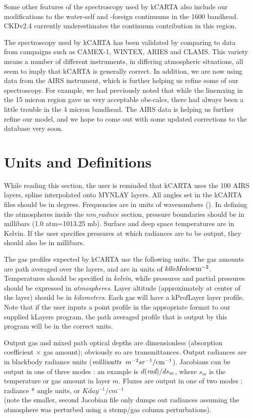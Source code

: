 \documentclass[12pt]{article}
\newcommand{\kc}{\textsf{kCARTA}\xspace}
\newcommand{\cm}{\hbox{cm}}
\begin{document}
Some other features of the spectroscopy used by \kc also include our 
modifications to the water-self and -foreign continuums in the 1600 \wn 
bandhead. CKDv2.4 currently underestimates the continuum contribution in this 
region.

The spectroscopy used by \kc has been validated by comparing to data from 
campaigns such as CAMEX-1, WINTEX, ARIES and CLAMS. This variety means a 
number of different instruments, in differing atmospheric situations, all seem
to imply that \kc is generally correct. In addition, we are now using data from
the AIRS instrument, which is further helping us refine some of our 
spectroscopy. For example, we had previously noted that while the linemxing 
in the 15 micron region gave us very acceptable obs-calcs, there had always 
been a little trouble in the 4 micron bandhead. The AIRS data is helping us 
further refine our model, and we hope to come out with some updated corrections
to the database very soon.

\section{Units and Definitions}

While reading this section, the user is reminded that \kc uses the 100
AIRS layers, spline interpolated onto MYNLAY layers. All angles set in the 
\kc files should be in degrees.
Frequencies are in units of wavenumbers (\wn).  In defining the
atmospheres inside the $nm\_radnce$ section, pressure boundaries should be
in millibars (1.0 atm=1013.25 mb).  Surface and deep space temperatures
are in Kelvin.  If the user specifies pressures at which radiances are
to be output, they should also be in millibars.

The gas profiles expected by \kc use the following units.  The gas
amounts are path averaged over the layers, and are in units of
$\hbox{\em kiloMoles} \cm^{-2}$.  Temperatures should be
specified in {\em kelvin}, while pressures and partial pressures
should be expressed in {\em atmospheres}.  Layer altitude
(approximately at center of the layer) should be in {\em
kilometers}.  Each gas will have a kProfLayer layer profile.  Note that if
the user inputs a point profile in the appropriate format to our
supplied {\sf kLayers} program, the path averaged profile that is
output by this program will be in the correct units.

Output gas and mixed path optical depths are dimensionless (absorption
coefficient $\times$ gas amount); obviously so are transmittances.
Output radiances are in blackbody radiance units ($\hbox{\em milliwatts}
\;\ m^{-2} sr^{-1}/\cm^{-1}$).  Jacobians can be output in one of three
modes : an example is $d(\hbox{\em rad})/ds_{m}$, where $s_{m}$ is the
temperature or gas amount in layer $m$. Fluxes are output in one of two 
modes : radiance * angle units, or $K day^{-1} /cm^{-1}$\\
(note the smaller, second Jacobian file only dumps out radiances assuming the
atmosphere was perturbed using a stemp/gas column perturbations).
\end{document}
